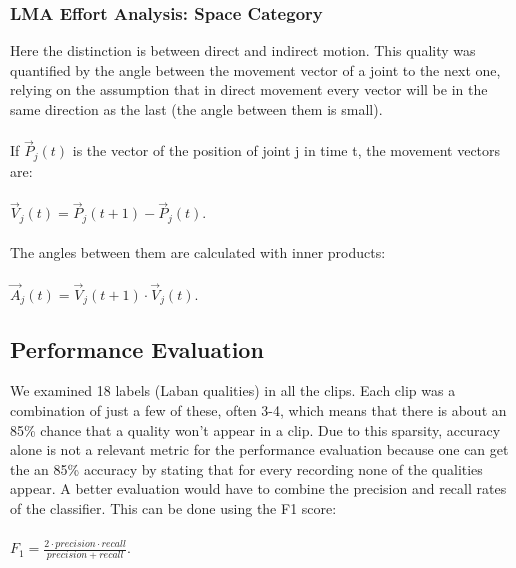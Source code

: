 \documentclass[11pt,twocolumn,varwidth=true,a4paper,fleqn]{article}
\begin{document}
\subsubsection{LMA Effort Analysis: Space Category}
Here the distinction is between direct and indirect motion. This quality was 
quantified by the angle between the movement vector of a joint to the next one,
relying on the assumption that in direct movement every vector will be in
the same direction as the last (the angle between them is small).
\\\\If $\vec{P}_{j}(t)$ is the vector of the position of joint j in time t, the
movement vectors are:
\\\\$\vec{V}_{j}(t) = \vec{P}_{j}(t+1) - \vec{P}_{j}(t).$
\\\\The angles between them are calculated with inner products:
\\\\$\vec{A}_{j}(t) = \vec{V}_{j}(t+1) \cdot \vec{V}_{j}(t).$

\subsection{Performance Evaluation}
We examined 18 labels (Laban qualities) in all the clips.  Each clip was a
combination of just a few of these, often 3-4, which means that there is
about an 85\% chance that a quality won't appear in a clip. Due to
this sparsity, accuracy alone is not a relevant metric for the
performance evaluation because one can get the an 85\% accuracy by stating that
for every recording none of the qualities appear. A better evaluation would have to
combine the precision and recall rates of the classifier. This can be done using 
the F1 score:
\\
\\$F_{1} = \frac{2\cdot precision\cdot recall}{precision+recall}.$
\end{document}
